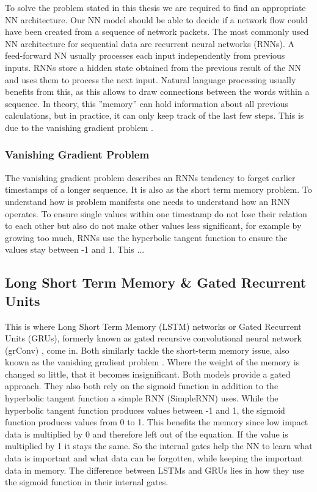 \documentclass[
	ngerman,
	ruledheaders=section,%
	class=report,%
	thesis={type=bachelor},%
	accentcolor=9c,%
	custommargins=true,%
	marginpar=false,%
	parskip=half-,%
	fontsize=11pt,%
]{tudapub}
\begin{document}
To solve the problem stated in this thesis we are required to find an appropriate NN architecture.
Our NN model should be able to decide if a network flow could have been created from a sequence of network packets.
The most commonly used NN architecture for sequential data are recurrent neural networks (RNNs).
A feed-forward NN usually processes each input independently from previous inputs.
RNNs store a hidden state obtained from the previous result of the NN and uses them to process the next input.
Natural language processing usually benefits from this, as this allows to draw connections between the words within a sequence.
In theory, this ''memory'' can hold information about all previous calculations,
but in practice, it can only keep track of the last few steps.
This is due to the vanishing gradient problem \cite{hochreiterLongShortTermMemory1997}.

\subsubsection{Vanishing Gradient Problem}

The vanishing gradient problem describes an RNNs tendency to forget earlier timestamps of a longer sequence.
It is also as the short term memory problem.
To understand how is problem manifests one needs to understand how an RNN operates.
To ensure single values within one timestamp do not lose their relation to each other but also do not make other values less significant, for example by growing too much, RNNs use the hyperbolic tangent function to ensure the values stay between -1 and 1.
This ...

\subsection{Long Short Term Memory \& Gated Recurrent Units}

This is where Long Short Term Memory (LSTM) networks \cite{hochreiterLongShortTermMemory1997} or Gated Recurrent Units (GRUs), formerly known as gated recursive convolutional neural network (grConv) \cite{bahdanauNeuralMachineTranslation2016}, come in.
Both similarly tackle the short-term memory issue,
also known as the vanishing gradient problem \cite{hochreiterLongShortTermMemory1997}.
Where the weight of the memory is changed so little, that it becomes insignificant.
Both models provide a gated approach.
They also both rely on the sigmoid function in addition to the hyperbolic tangent function a simple RNN (SimpleRNN) uses.
While the hyperbolic tangent function produces values between -1 and 1,
the sigmoid function produces values from 0 to 1.
This benefits the memory since low impact data is multiplied by 0 and therefore left out of the equation.
If the value is multiplied by 1 it stays the same.
So the internal gates help the NN to learn what data is important and what data can be forgotten, while keeping the important data in memory.
The difference between LSTMs and GRUs lies in how they use the sigmoid function in their internal gates.
\end{document}
